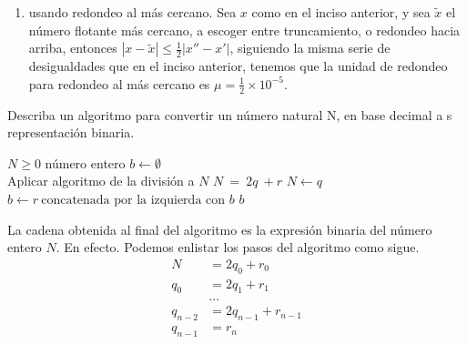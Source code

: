 \documentclass[11pt, oneside]{article}
\begin{document}
\begin{problema}
\begin{enumerate}
\begin{enumerate}
            \item usando redondeo al más cercano. 
            Sea \(x\) como en el inciso anterior, y sea \(\tilde{x}\) el número flotante más cercano, a escoger entre truncamiento, o redondeo hacia arriba, entonces \(|x-\tilde{x}|\le\frac{1}{2}|x''-x'|\), siguiendo la misma serie de desigualdades que en el inciso anterior, tenemos que la unidad de redondeo para redondeo al más cercano es \(\mu=\frac{1}{2}\times10^{-5}\).
            
        \end{enumerate}
    \end{enumerate}

\end{problema}

\begin{problema} \leavevmode

    Describa un algoritmo para convertir un número natural N, en base decimal a s representación binaria. 

    \begin{algorithm}
    \caption{Decimal a Binario}
    \begin{algorithmic}
        \Require $N \geq  0$ número entero 
        \State $b \gets \emptyset$ 
        \\
            Aplicar algoritmo de la división a $N$
            \State $N\ =\ 2q\ + r$ 
            \State $N \gets q$
            \State $b \gets r\ \text{concatenada por la izquierda con } b$ 
        \EndWhile
        \State \Return $b$
    \end{algorithmic}
    \end{algorithm}

La cadena obtenida al final del algoritmo es la expresión binaria del número  entero $N$. En efecto. Podemos enlistar los pasos del algoritmo como sigue.
\begin{align*}
N &= 2q_0 + r_0\\
q_0 &= 2q_1 + r_1\\
&\hdots\\
q_{n-2} &= 2q_{n-1} + r_{n-1}\\
q_{n-1} &= r_n
\end{align*}


\end{problema}
\end{document}
